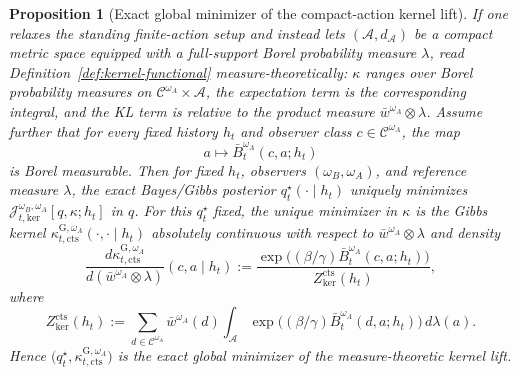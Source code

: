 \documentclass[11pt]{article}
\newtheorem{proposition}[theorem]{Proposition}
\theoremstyle{definition}
\theoremstyle{remark}
\theoremstyle{plain}
\theoremstyle{definition}
\newcommand{\Acal}{\mathcal{A}}
\newcommand{\Ccal}{\mathcal{C}}
\begin{document}
\begin{proposition}[Exact global minimizer of the compact-action kernel lift]
\label{prop:kernel-functional-minimizer-compact}
If one relaxes the standing finite-action setup and instead lets $(\Acal,d_\Acal)$ be a compact metric space equipped with a full-support Borel probability measure $\lambda$, read Definition~\ref{def:kernel-functional} measure-theoretically: $\kappa$ ranges over Borel probability measures on $\Ccal^{\omega_A}\times\Acal$, the expectation term is the corresponding integral, and the KL term is relative to the product measure $\bar w^{\omega_A}\otimes\lambda$. Assume further that for every fixed history $h_t$ and observer class $c\in\Ccal^{\omega_A}$, the map
\[
a\longmapsto \bar B_t^{\omega_A}(c,a;h_t)
\]
is Borel measurable. Then for fixed $h_t$, observers $(\omega_B,\omega_A)$, and reference measure $\lambda$, the exact Bayes/Gibbs posterior $q_t^\star(\cdot\mid h_t)$ uniquely minimizes $\mathcal J_{t,\mathrm{ker}}^{\omega_B,\omega_A}[q,\kappa;h_t]$ in $q$. For this $q_t^\star$ fixed, the unique minimizer in $\kappa$ is the Gibbs kernel $\kappa_{t,\mathrm{cts}}^{\mathrm G,\omega_A}(\cdot,\cdot\mid h_t)$ absolutely continuous with respect to $\bar w^{\omega_A}\otimes\lambda$ and density
\[
\frac{d\kappa_{t,\mathrm{cts}}^{\mathrm G,\omega_A}}{d(\bar w^{\omega_A}\otimes\lambda)}(c,a\mid h_t)
:=
\frac{\exp\!\bigl((\beta/\gamma)\bar B_t^{\omega_A}(c,a;h_t)\bigr)}
{Z_{\mathrm{ker}}^{\mathrm{cts}}(h_t)},
\]
where
\[
Z_{\mathrm{ker}}^{\mathrm{cts}}(h_t)
:=
\sum_{d\in\Ccal^{\omega_A}}\bar w^{\omega_A}(d)\int_{\Acal}
\exp\!\bigl((\beta/\gamma)\bar B_t^{\omega_A}(d,a;h_t)\bigr)\,d\lambda(a).
\]
Hence $\bigl(q_t^\star,\kappa_{t,\mathrm{cts}}^{\mathrm G,\omega_A}\bigr)$ is the exact global minimizer of the measure-theoretic kernel lift.
\end{proposition}
\end{document}
